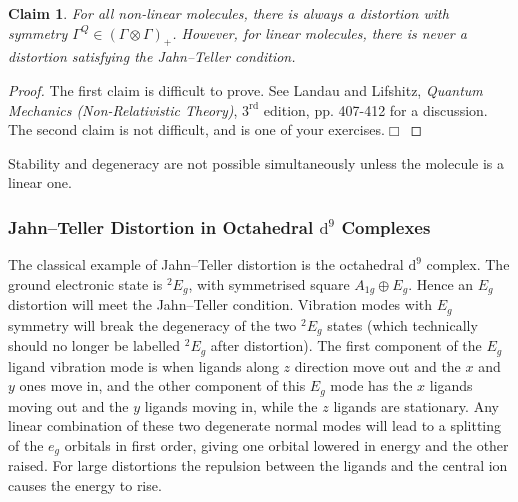 \documentclass{article}
\theoremstyle{plain}\theoremheaderfont{\normalfont\itshape}\theorembodyfont{\rmfamily}\theoremseparator{.}\newtheorem*{rem}{Remark}\newtheorem*{ex}{Example}\newtheorem*{proof}{Proof}\newtheorem*{altp}{Alternative proof}
\theoremstyle{plain}\theoremheaderfont{\normalfont\bfseries}\theorembodyfont{\rmfamily}\theoremseparator{.}\newtheorem{thm}{Theorem}[section]\newtheorem{lem}[thm]{Lemma}\newtheorem{prop}[thm]{Proposition}\newtheorem*{cor}{Corollary}\newtheorem{defn}[thm]{Definition}\newtheorem{clm}[thm]{Claim}\newtheorem{clminproof}{Claim}\newtheorem*{law}{Law}\newtheorem{pos}[thm]{Postulate}
\theoremstyle{break}\theoremheaderfont{\normalfont\itshape}\theorembodyfont{\rmfamily}\theoremseparator{.\medskip}\newtheorem*{proofskip}{Proof}\newtheorem*{exs}{Examples}\newtheorem*{rems}{Remarks}
\theoremstyle{break}\theoremheaderfont{\normalfont\bfseries}\theorembodyfont{\rmfamily}\theoremseparator{.\medskip}\newtheorem{lemskip}[thm]{Lemma}\newtheorem{defnskip}[thm]{Definition}\newtheorem{propskip}[thm]{Proposition}\newtheorem{thmskip}[thm]{Theorem}
\numberwithin{equation}{section}
\newcommand{\qed}{\hfill\ensuremath{\Box}}
\begin{document}
    \begin{clm}
        For all non-linear molecules, there is always a distortion with symmetry \(\Gamma^Q\in(\Gamma\otimes\Gamma)_+\). However, for linear molecules, there is never a distortion satisfying the Jahn--Teller condition.
    \end{clm}
    \begin{proof}
        The first claim is difficult to prove. See Landau and Lifshitz, \textit{Quantum Mechanics (Non-Relativistic Theory)}, \(3^{\text{rd}}\) edition, pp. 407-412 for a discussion. The second claim is not difficult, and is one of your exercises.\qed
    \end{proof}
    Stability and degeneracy are not possible simultaneously unless the molecule is a linear one.

    \subsubsection{Jahn--Teller Distortion in Octahedral \texorpdfstring{\(\mathrm{d}^9\)}{d9} Complexes}
    The classical example of Jahn--Teller distortion is the octahedral \(\mathrm{d}^9\) complex. The ground electronic state is \(^2E_g\), with symmetrised square \(A_{1g}\oplus E_g\). Hence an \(E_g\) distortion will meet the Jahn--Teller condition. Vibration modes with \(E_g\) symmetry will break the degeneracy of the two \(^2E_g\) states (which technically should no longer be labelled \(^2E_g\) after distortion). The first component of the \(E_g\) ligand vibration mode is when ligands along \(z\) direction move out and the \(x\) and \(y\) ones move in, and the other component of this \(E_g\) mode has the \(x\) ligands moving out and the \(y\) ligands moving in, while the \(z\) ligands are stationary. Any linear combination of these two degenerate normal modes will lead to a splitting of the \(e_g\) orbitals in first order, giving one orbital lowered in energy and the other raised. For large distortions the repulsion between the ligands and the central ion causes the energy to rise.
\end{document}
